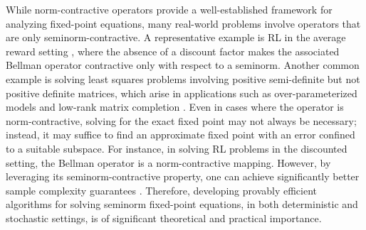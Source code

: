\documentclass[11 pt]{article}
\begin{document}
	
	
	While norm-contractive operators provide a well-established framework for analyzing fixed-point equations, many real-world problems involve operators that are only seminorm-contractive. A representative example is RL in the average reward setting \cite{mahadevan1996average,puterman2014markov}, where the absence of a discount factor makes the associated Bellman operator contractive only with respect to a seminorm. Another common example is solving least squares problems involving positive semi-definite but not positive definite matrices, which arise in applications such as over-parameterized models \cite{li2018algorithmic} and low-rank matrix completion \cite{shah2020sample}. Even in cases where the operator is norm-contractive, solving for the exact fixed point may not always be necessary; instead, it may suffice to find an approximate fixed point with an error confined to a suitable subspace. For instance, in solving RL problems in the discounted setting, the Bellman operator is a norm-contractive mapping. However, by leveraging its seminorm-contractive property, one can achieve significantly better sample complexity guarantees \cite{devraj2021q}. Therefore, developing provably efficient algorithms for solving seminorm fixed-point equations, in both deterministic and stochastic settings, is of significant theoretical and practical importance.
	
\end{document}
